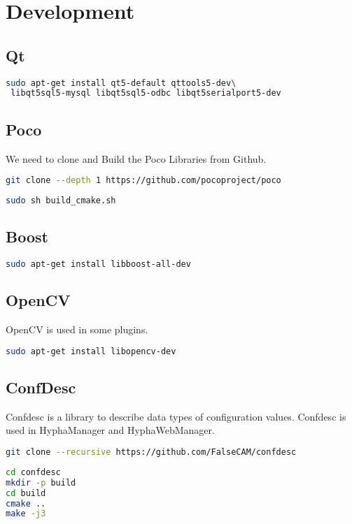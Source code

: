 \documentclass[english,a4paper,11pt]{report}
\begin{document}
\chapter{Development}

\section{Qt}
\begin{lstlisting}[language=bash,caption={install qt libraries}]
sudo apt-get install qt5-default qttools5-dev\
 libqt5sql5-mysql libqt5sql5-odbc libqt5serialport5-dev
\end{lstlisting}

\section{Poco}
We need to clone and Build the Poco Libraries from Github.
\begin{lstlisting}[language=bash,caption={git clone poco}]
git clone --depth 1 https://github.com/pocoproject/poco
\end{lstlisting}
\begin{lstlisting}[language=bash,caption={build poco}]
sudo sh build_cmake.sh
\end{lstlisting}


\section{Boost}
\begin{lstlisting}[language=bash,caption={install boost libraries}]
sudo apt-get install libboost-all-dev
\end{lstlisting}

\section{OpenCV}
OpenCV is used in some plugins.
\begin{lstlisting}[language=bash,caption={install opencv libraries}]
sudo apt-get install libopencv-dev
\end{lstlisting}

\section{ConfDesc}
Confdesc is a library to describe data types of configuration values.
Confdesc is used in HyphaManager and HyphaWebManager.
\begin{lstlisting}[language=bash,caption={git clone confdesc}]
git clone --recursive https://github.com/FalseCAM/confdesc
\end{lstlisting}
\begin{lstlisting}[language=bash,caption={build poco}]
cd confdesc
mkdir -p build
cd build
cmake ..
make -j3
\end{lstlisting}
\end{document}
